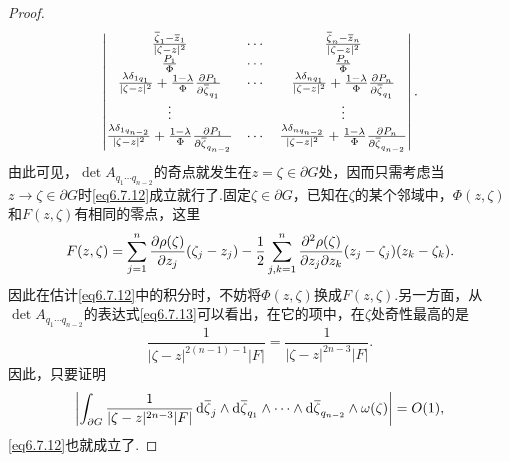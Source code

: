 \begin{proof}
\begin{equation}
\begin{vmatrix}
			\frac{{}\mkern1mu\overline{\mkern-1mu\zeta}_1-{}\mkern1mu\overline{\mkern-1muz}_1}{|\zeta-z|^2} & \cdots &\frac{{}\mkern1mu\overline{\mkern-1mu\zeta}_n-{}\mkern1mu\overline{\mkern-1muz}_n}{|\zeta-z|^2}\\
			\frac{P_1}{\Phi} & \cdots & \frac{P_n}{\Phi}\\
			\frac{\lambda\delta_{1q_1}}{|\zeta-z|^2}+\frac{1-\lambda}{\Phi}\frac{\partial P_1}{\partial {}\mkern1mu\overline{\mkern-1mu\zeta}_{q_1}} & \cdots & \frac{\lambda\delta_{nq_1}}{|\zeta-z|^2}+\frac{1-\lambda}{\Phi}\frac{\partial P_n}{\partial {}\mkern1mu\overline{\mkern-1mu\zeta}_{q_1}}\\
			\vdots & & \vdots\\
			\frac{\lambda\delta_{1q_{n-2}}}{|\zeta-z|^2}+\frac{1-\lambda}{\Phi}\frac{\partial P_1}{\partial {}\mkern1mu\overline{\mkern-1mu\zeta}_{q_{n-2}}} & \cdots & \frac{\lambda\delta_{nq_{n-2}}}{|\zeta-z|^2}+\frac{1-\lambda}{\Phi}\frac{\partial P_n}{\partial {}\mkern1mu\overline{\mkern-1mu\zeta}_{q_{n-2}}}
		\end{vmatrix}.
	\end{equation}
	由此可见，$\det A_{q_1\cdots q_{n-2}}$的奇点就发生在$z=\zeta\in\partial G$处，因而只需考虑当$z\to\zeta\in\partial G$时\eqref{eq6.7.12}成立就行了.固定$\zeta\in\partial G$，已知在$\zeta$的某个邻域中，$\Phi(z,\zeta)$和$F(z,\zeta)$有相同的零点，这里
	\begin{equation}\label{eq6.7.14}
		F(z,\zeta)
		=\sum_{j=1}^{n}\frac{\partial \rho(\zeta)}{\partial z_j}(\zeta_j-z_j)-\frac12\sum_{j,k=1}^{n}\frac{\partial^2 \rho(\zeta)}{\partial z_j\partial z_k}(z_j-\zeta_j)(z_k-\zeta_k).
	\end{equation}
	因此在估计\eqref{eq6.7.12}中的积分时，不妨将$\Phi(z,\zeta)$换成$F(z,\zeta)$.另一方面，从$\det A_{q_1\cdots q_{n-2}}$的表达式\eqref{eq6.7.13}可以看出，在它的项中，在$\zeta$处奇性最高的是
	\[\frac1{|\zeta-z|^{2(n-1)-1}|F|}=\frac1{|\zeta-z|^{2n-3}|F|}.\]
	因此，只要证明
	\begin{equation}\label{eq6.7.15}
		\left|\int_{\partial G}\frac1{|\zeta-z|^{2n-3}|F|}\mathop{}\!\mathrm{d}{}\mkern1mu\overline{\mkern-1mu\zeta}_j\wedge\mathop{}\!\mathrm{d}{}\mkern1mu\overline{\mkern-1mu\zeta}_{q_1}\wedge\cdots\wedge\mathop{}\!\mathrm{d}{}\mkern1mu\overline{\mkern-1mu\zeta}_{q_{n-2}}\wedge\omega(\zeta)\right|=O(1),
	\end{equation}
	\eqref{eq6.7.12}也就成立了.
	

\end{proof}

